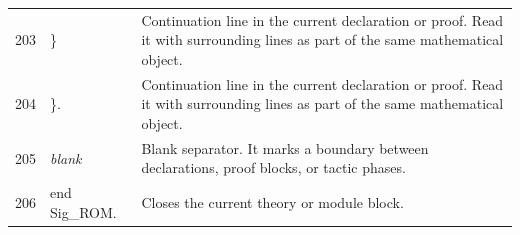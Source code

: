 \documentclass[10pt]{article}
\begin{document}
\begin{longtable}{r L{0.53\textwidth} L{0.37\textwidth}}
203 & {\ttfamily\scriptsize   \}} & Continuation line in the current declaration or proof.  Read it with surrounding lines as part of the same mathematical object. \\
204 & {\ttfamily\scriptsize \}.} & Continuation line in the current declaration or proof.  Read it with surrounding lines as part of the same mathematical object. \\
205 & {\ttfamily\scriptsize \emph{blank}} & Blank separator.  It marks a boundary between declarations, proof blocks, or tactic phases. \\
206 & {\ttfamily\scriptsize end Sig\_ROM.} & Closes the current theory or module block. \\
\bottomrule
\end{longtable}
\end{document}
